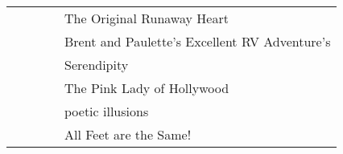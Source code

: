 \begin{tabular}{lllll}
               &                 &                      &                      & The Original Runaway Heart                    \\
               &                 &                      &                      & Brent and Paulette's Excellent RV Adventure's \\
               &                 &                      &                      & Serendipity                                   \\
               &                 &                      &                      & The Pink Lady of Hollywood                    \\
               &                 &                      &                      & poetic illusions                              \\
               &                 &                      &                      & All Feet are the Same!                        \\
\hline
\end{tabular}